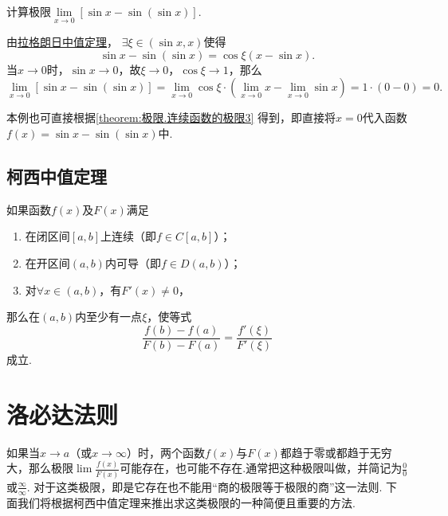 \begin{example}
\def\l{\lim\limits_{x\to0}}%
计算极限\(\l \left[\sin x - \sin(\sin x)\right]\).
\begin{solution}
由\hyperref[theorem:微分中值定理.拉格朗日中值定理]{拉格朗日中值定理}，%
\(\exists\xi\in(\sin x,x)\)使得\[
\sin x - \sin(\sin x)
= \cos\xi (x-\sin x).
\]当\(x\to0\)时，\(\sin x\to0\)，故\(\xi\to0\)，\(\cos\xi\to1\)，那么\[
\l \left[\sin x - \sin(\sin x)\right]
= \l \cos\xi \cdot \left(\l x - \l \sin x\right)
= 1 \cdot (0-0) = 0.
\]
\end{solution}
\end{example}
本例也可直接根据\cref{theorem:极限.连续函数的极限3} 得到，即直接将\(x=0\)代入函数\(f(x) = \sin x - \sin(\sin x)\)中.

\subsection{柯西中值定理}
\begin{theorem}[柯西中值定理]\label{theorem:微分中值定理.柯西中值定理}
如果函数\(f(x)\)及\(F(x)\)满足
\begin{enumerate}
\item 在闭区间\([a,b]\)上连续（即\(f \in C[a,b]\)）；
\item 在开区间\((a,b)\)内可导（即\(f \in D(a,b)\)）；
\item 对\(\forall x\in(a,b)\)，有\(F'(x) \neq 0\)，%
\end{enumerate}
那么在\((a,b)\)内至少有一点\(\xi\)，使等式
\begin{equation}
\frac{f(b)-f(a)}{F(b)-F(a)}=\frac{f'(\xi)}{F'(\xi)}
\end{equation}
成立.
\end{theorem}

\section{洛必达法则}
如果当\(x \to a\)（或\(x \to \infty\)）时，两个函数\(f(x)\)与\(F(x)\)都趋于零或都趋于无穷大，那么极限\(\lim\frac{f(x)}{F(x)}\)可能存在，也可能不存在.通常把这种极限叫做，并简记为\(\frac{0}{0}\)或\(\frac{\infty}{\infty}\).
对于这类极限，即是它存在也不能用“商的极限等于极限的商”这一法则.
下面我们将根据柯西中值定理来推出求这类极限的一种简便且重要的方法.

